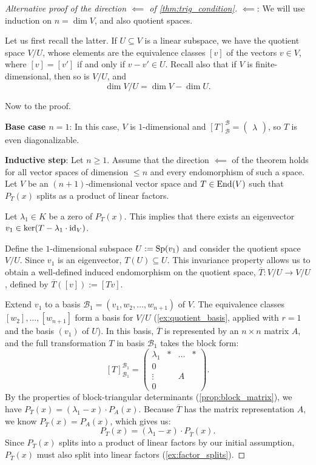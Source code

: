 \begin{proof}[Alternative proof of the direction $\impliedby$ of \cref{thm:trig_condition}]
  $\impliedby$: We will use induction on $n = \dim V$, and also quotient spaces.

  Let us first recall the latter. If $U \subseteq V$ is a linear subspace, we have the quotient space $V/U$, whose elements are the equivalence classes $[v]$ of the vectors $v \in V$, where $[v] = [v']$ if and only if $v - v' \in U$. Recall also that if $V$ is finite-di\-men\-sional, then so is $V/U$, and
  \[ \dim V/U = \dim V - \dim U. \]

  Now to the proof.

  \textbf{Base case $n=1$}: In this case, $V$ is $1$-dimensional and $[T]_{\mathcal{B}}^{\mathcal{B}} = \left(\begin{smallmatrix} \lambda \end{smallmatrix}\right)$, so $T$ is even diagonalizable.

  \textbf{Inductive step}: Let $n \ge 1$. Assume that the direction $\impliedby$ of the theorem holds for all vector spaces of dimension $\le n$ and every endomorphism of such a space.
  Let $V$ be an $(n+1)$-dimensional vector space and $T \in \operatorname{End}(V)$ such that $P_T(x)$ splits as a product of linear factors.

  Let $\lambda_1 \in K$ be a zero of $P_T(x)$. This implies that there exists an eigenvector $v_1 \in \ker(T - \lambda_1 \cdot \operatorname{id}_V)$.

  Define the $1$-dimensional subspace $U := \operatorname{Sp}(v_1)$ and consider the quotient space $V/U$. Since $v_1$ is an eigenvector, $T(U) \subseteq U$. This invariance property allows us to obtain a well-defined induced endomorphism on the quotient space, $\overline{T} : V/U \rightarrow V/U$, defined by $\overline{T}([v]) := [Tv]$.

  Extend $v_1$ to a basis $\mathcal{B}_1 = (v_1, w_2, \dots, w_{n+1})$ of $V$.
  The equivalence classes $[w_2], \dots, [w_{n+1}]$ form a basis for $V/U$ (\cref{ex:quotient_basis}, applied with $r = 1$ and the basis $(v_1)$ of $U$). In this basis, $\overline{T}$ is represented by an $n \times n$ matrix $A$, and the full transformation $T$ in basis $\mathcal{B}_1$ takes the block form:
  \begin{equation} \label{eq:block_matrix_induction}
    [T]_{\mathcal{B}_1}^{\mathcal{B}_1} = \left(\begin{array}{c|ccc} \lambda_1 & * & \dots & * \\ \hline 0 & & & \\ \vdots & & A & \\ 0 & & & \end{array}\right).
  \end{equation}
  By the properties of block-triangular determinants (\cref{prop:block_matrix}), we have $P_T(x) = (\lambda_1 - x) \cdot P_A(x)$. Because $\overline{T}$ has the matrix representation $A$, we know $P_{\overline{T}}(x) = P_A(x)$, which gives us:
  \[ P_T(x) = (\lambda_1 - x) \cdot P_{\overline{T}}(x). \]
  Since $P_T(x)$ splits into a product of linear factors by our initial assumption, $P_{\overline{T}}(x)$ must also split into linear factors (\cref{ex:factor_splits}).


\end{proof}
